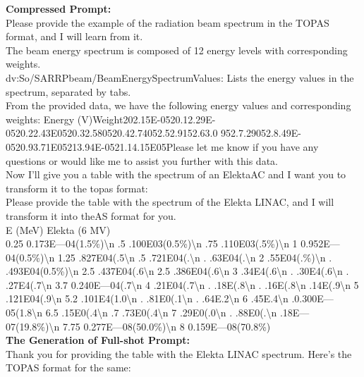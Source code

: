 \begin{figure*}[htb]
    \begin{tcolorbox}
    \textbf{Compressed Prompt:}\\
    Please provide the example of the radiation beam spectrum in the TOPAS format, and I will learn from it.\\
    The beam energy spectrum is composed of 12 energy levels with corresponding weights.\\
    dv:So/SARRPbeam/BeamEnergySpectrumValues: Lists the energy values in the spectrum, separated by tabs.\\
    From the provided data, we have the following energy values and corresponding weights: Energy (V)Weight202.15E-0520.12.29E-0520.22.43E0520.32.580520.42.74052.52.9152.63.0 952.7.29052.8.49E-0520.93.71E05213.94E-0521.14.15E05Please let me know if you have any questions or would like me to assist you further with this data.\\
    Now I'll give you a table with the spectrum of an ElektaAC and I want you to transform it to the topas format:\\
    Please provide the table with the spectrum of the Elekta LINAC, and I will transform it into theAS format for you.\\
    E (MeV)	Elekta (6 MV)\\
    0.25	0.173E—04(1.5\%)\textbackslash n
    .5	.100E03(0.5\%)\textbackslash n
    .75	.110E03(.5\%)\textbackslash n
    1	0.952E—04(0.5\%)\textbackslash n
    1.25	.827E04(.5\textbackslash n
    .5	.721E04(.\textbackslash n
    .	.63E04(.\textbackslash n
    2	.55E04(.\%)\textbackslash n
    .	.493E04(0.5\%)\textbackslash n
    2.5	.437E04(.6\textbackslash n
    2.5	.386E04(.6\textbackslash n
    3	.34E4(.6\textbackslash n
    .	.30E4(.6\textbackslash n
    .	.27E4(.7\textbackslash n
    3.7	0.240E—04(.7\textbackslash n
    4	.21E04(.7\textbackslash n
    .	.18E(.8\textbackslash n
    .	.16E(.8\textbackslash n
    .14E(.9\textbackslash n
    5	.121E04(.9\textbackslash n
    5.2	.101E4(1.0\textbackslash n
    .	.81E0(.1\textbackslash n
    .	.64E.2\textbackslash n
    6	.45E.4\textbackslash n
    .0.300E—05(1.8\textbackslash n
    6.5	.15E0(.4\textbackslash n
    .7	.73E0(.4\textbackslash n
    7	.29E0(.0\textbackslash n
    .	.88E0(.\textbackslash n
    	.18E—07(19.8\%)\textbackslash n
    7.75	0.277E—08(50.0\%)\textbackslash n
    8	0.159E—08(70.8\%)\\
    \textbf{The Generation of Full-shot Prompt:}\\
    Thank you for providing the table with the Elekta LINAC spectrum. Here's the TOPAS format for the same:\\

\end{tcolorbox}
\end{figure*}
